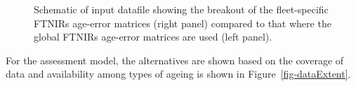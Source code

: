 \documentclass[
  letterpaper,
  DIV=11,
  numbers=noendperiod]{scrreprt}
\begin{document}
\begin{figure}


\caption{\label{fig-dataFile}Schematic of input datafile showing the
breakout of the fleet-specific FTNIRs age-error matrices (right panel)
compared to that where the global FTNIRs age-error matrices are used
(left panel).}

\end{figure}%

For the assessment model, the alternatives are shown based on the
coverage of data and availability among types of ageing is shown in
Figure~\ref{fig-dataExtent}.
\end{document}
